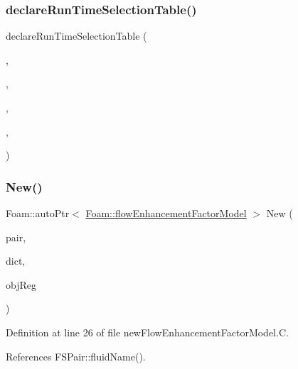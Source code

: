 \subsubsection{\texorpdfstring{declare\+Run\+Time\+Selection\+Table()}{declareRunTimeSelectionTable()}}
{\footnotesize\ttfamily declare\+Run\+Time\+Selection\+Table (\begin{DoxyParamCaption}\item[{auto\+Ptr}]{,  }\item[{\hyperlink{classFoam_1_1flowEnhancementFactorModel}{flow\+Enhancement\+Factor\+Model}}]{,  }\item[{flow\+Enhancement\+Factor\+Models}]{,  }\item[{(const \hyperlink{classFoam_1_1FSPair}{F\+S\+Pair} \&pair, const dictionary \&dict, const object\+Registry \&obj\+Reg)}]{,  }\item[{(pair, dict, obj\+Reg)}]{ }\end{DoxyParamCaption})}

\mbox{\label{classFoam_1_1flowEnhancementFactorModel_aaefd41c8414c438fc5006a8fa0fdb238}} 
\subsubsection{\texorpdfstring{New()}{New()}}
{\footnotesize\ttfamily Foam\+::auto\+Ptr$<$ \hyperlink{classFoam_1_1flowEnhancementFactorModel}{Foam\+::flow\+Enhancement\+Factor\+Model} $>$ New (\begin{DoxyParamCaption}\item[{const \hyperlink{classFoam_1_1FSPair}{F\+S\+Pair} \&}]{pair,  }\item[{const dictionary \&}]{dict,  }\item[{const object\+Registry \&}]{obj\+Reg }\end{DoxyParamCaption})\hspace{0.3cm}{\ttfamily [static]}}



Definition at line 26 of file new\+Flow\+Enhancement\+Factor\+Model.\+C.



References F\+S\+Pair\+::fluid\+Name().



